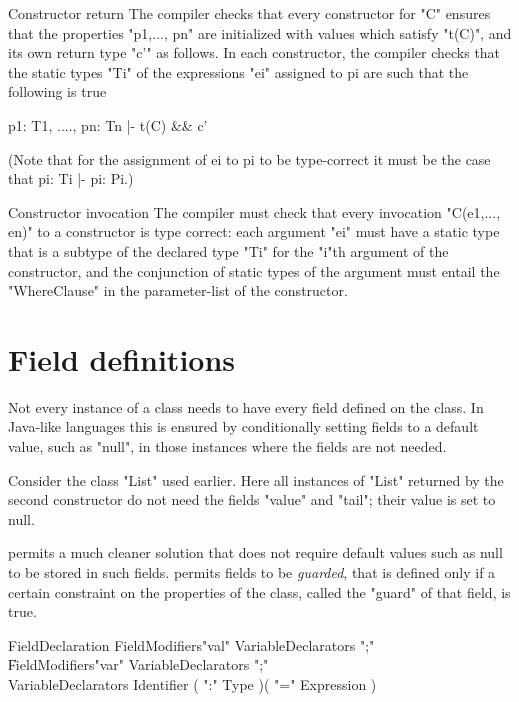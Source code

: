 \begin{staticrule}{Constructor return}
   The compiler checks that every constructor for \xcd"C" ensures that
   the properties \xcd"p1,..., pn" are initialized with values which satisfy
   \xcd"t(C)", and its own return type \xcd"c'" as follows.  In each constructor, the
   compiler checks that the static types \xcd"Ti" of the expressions \xcd"ei"
   assigned to pi are such that the following is true
\begin{xten}
p1: T1, ...., pn: Tn |- t(C) && c'     
\end{xten}
\end{staticrule}
(Note that for the assignment of ei to pi to be type-correct it must be the
    case that pi: Ti |- pi: Pi.) 


\begin{staticrule}{Constructor invocation}
The compiler must check that every invocation \xcd"C(e1,..., en)" to a
constructor is type correct: each argument \xcd"ei" must have a static type
that is a subtype of the declared type \xcd"Ti" for the \xcd"i"th argument of the
constructor, and the conjunction of static types of the argument must
entail the \xcd"WhereClause" in the parameter-list of the constructor.
\end{staticrule}

\section{Field definitions}

Not every instance of a class needs to have every field defined on the
class. In Java-like languages this is ensured by conditionally setting
fields to a default value, such as \xcd"null", in those instances where the
fields are not needed.  

Consider the class \xcd"List" used earlier.  Here all instances of \xcd"List"
returned by the second constructor do not need the fields \xcd"value" and
\xcd"tail"; their value is set to null.

\Xten{} permits a much cleaner solution that does not require default
values such as null to be stored in such fields. \Xten{} permits fields to
be {\em guarded}, that is defined only if a certain constraint on the
properties of the class, called the \xcd"guard" of that field, is true.

\begin{grammar}
FieldDeclaration  \:
   FieldModifiers\opt \xcd"val" VariableDeclarators \xcd";" \\
   \|
   FieldModifiers\opt \xcd"var" VariableDeclarators \xcd";" \\
VariableDeclarators \:
   Identifier ( \xcd":" Type )\opt ( \xcd"=" Expression )\opt \\
\end{grammar}

